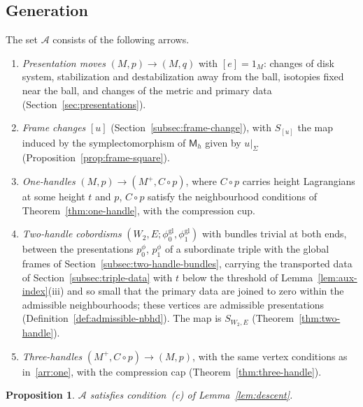 \documentclass[11pt]{amsart}
\newtheorem{proposition}[theorem]{Proposition}
\theoremstyle{definition}
\theoremstyle{remark}
\theoremstyle{plain}
\numberwithin{equation}{section}
\newcommand{\Msf}{\mathsf{M}}
\begin{document}
\subsection{Generation}\label{subsec:generation}

The set $\mathcal A$ consists of the following arrows.
\begin{enumerate}[label=(A\arabic*)]
\item\label{arr:pres} \emph{Presentation moves} $(M,p)\to(M,q)$ with
  $[e]=1_M$: changes of disk system, stabilization and destabilization
  away from the ball, isotopies fixed near the ball, and changes of the metric and primary data (Section~\ref{sec:presentations}).
\item\label{arr:frame} \emph{Frame changes} $[u]$
  (Section~\ref{subsec:frame-change}), with $S_{[u]}$ the map induced by
  the symplectomorphism of $\Msf_h$ given by $u|_\Sigma$
  (Proposition~\ref{prop:frame-square}).
\item\label{arr:one} \emph{One-handles} $(M,p)\to(M^+,C\circ p)$, where $C\circ p$
  carries height Lagrangians at some height $t$ and $p$, $C\circ p$ satisfy the
  neighbourhood conditions of Theorem~\ref{thm:one-handle}, with the
  compression cup.
\item\label{arr:two} \emph{Two-handle cobordisms} $(W_2,E;\phi_0^{\mathrm{gl}},
  \phi_1^{\mathrm{gl}})$ with bundles trivial at both ends, between the
  presentations $p_0^\phi$, $p_1^\phi$ of a subordinate triple with the
  global frames of Section~\ref{subsec:two-handle-bundles}, carrying the
  transported data of Section~\ref{subsec:triple-data} with $t$ below the
  threshold of Lemma~\ref{lem:aux-index}(iii) and so small that the primary data are joined
  to zero within the admissible neighbourhoods; these vertices are admissible
  presentations (Definition~\ref{def:admissible-nbhd}). The map is $S_{W_2,E}$ (Theorem~\ref{thm:two-handle}).
\item\label{arr:three} \emph{Three-handles} $(M^+,C\circ p)\to(M,p)$, with the
  same vertex conditions as in~\ref{arr:one}, with the compression cap
  (Theorem~\ref{thm:three-handle}).
\end{enumerate}

\begin{proposition}\label{prop:generation}
$\mathcal A$ satisfies condition~(c) of Lemma~\ref{lem:descent}.
\end{proposition}
\end{document}

